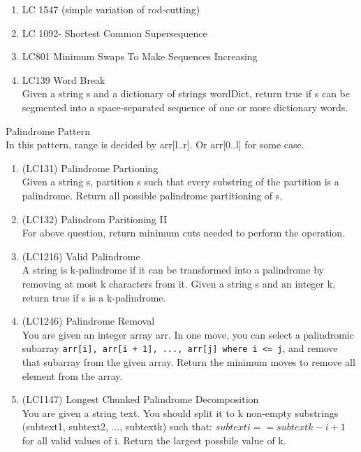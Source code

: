 \begin{exercise}
\begin{enumerate}
    \item LC 1547 (simple variation of rod-cutting)
    \item LC 1092- Shortest Common Supersequence
    \item LC801 Minimum Swaps To Make Sequences Increasing 
    \item LC139 Word Break\\ Given a string s and a dictionary of strings wordDict, return true if s can be segmented into a space-separated sequence of one or more dictionary words.
\end{enumerate}


    { \Large Palindrome Pattern \\}
    In this pattern, range is decided by arr[l..r]. Or arr[0..l] for some case.
    \begin{enumerate}
        \item (LC131) Palindrome Partioning \\Given a string s, partition s such that every substring of the partition is a palindrome. Return all possible palindrome partitioning of s. 
        
        \item (LC132) Palindrom Paritioning II \\ For above question, return minimum cuts needed to perform the operation.

        \item (LC1216) Valid Palindrome \\A string is k-palindrome if it can be transformed into a palindrome by removing at most k characters from it. Given a string s and an integer k, return true if s is a k-palindrome.

        \item (LC1246) Palindrome Removal\\ You are given an integer array arr.
        In one move, you can select a palindromic subarray \verb|arr[i], arr[i + 1], ..., arr[j] where i <= j|, and remove that subarray from the given array.
        Return the minimum moves to remove all element from the array.

        \item (LC1147) Longest Chunked Palindrome Decomposition \\You are given a string text. You should split it to k non-empty substrings (subtext1, subtext2, ..., subtextk) such that:
        $subtexti == subtextk - i + 1$ for all valid values of i.
        Return the largest possbile value of k.


\end{enumerate}
\end{exercise}
